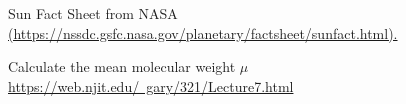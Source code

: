 \documentclass{article}
\begin{document}
\begin{thebibliography}{00}

Sun Fact Sheet from NASA\\
 \href{(https://nssdc.gsfc.nasa.gov/planetary/factsheet/sunfact.html).}{(https://nssdc.gsfc.nasa.gov/planetary/factsheet/sunfact.html).}

Calculate the mean molecular weight $\mu$\\
 \href{https://web.njit.edu/~gary/321/Lecture7.html}{https://web.njit.edu/~gary/321/Lecture7.html}
 
\end{thebibliography}
\end{document}
